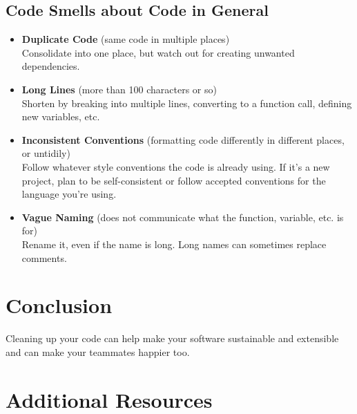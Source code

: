\subsection{Code Smells about Code in General}

\begin{itemize}
\item{\textbf{Duplicate Code} (same code in multiple places)\\Consolidate into one place, but watch out for creating unwanted dependencies.
\spacer}
\item{\textbf{Long Lines} (more than 100 characters or so)\\Shorten by breaking into multiple lines, converting to a function call, defining new variables, etc.
\spacer}
\item{\textbf{Inconsistent Conventions} (formatting code differently in different places, or untidily)\\Follow whatever style conventions the code is already using. If it's a new project, plan to be self-consistent or follow accepted conventions for the language you're using.
\spacer}
\item{\textbf{Vague Naming} (does not communicate what the function, variable, etc. is for)\\Rename it, even if the name is long. Long names can sometimes replace comments.
\spacer
}
\end{itemize}

\nomargins
\section{Conclusion}
Cleaning up your code can help make your software sustainable and extensible and can make your teammates happier too.

\section{Additional Resources}

\begin{description}
\item {}
\item {}
\item {}
\item {}
\end{description}